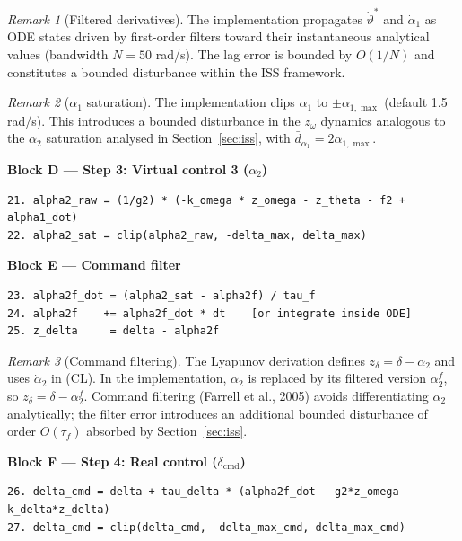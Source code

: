 \documentclass[11pt,a4paper]{article}
\theoremstyle{plain}
\theoremstyle{remark}
\newtheorem{remark}{Remark}[section]
\newcommand{\vths}{\vartheta^*}
\newcommand{\zom}{z_{\omega}}
\newcommand{\zdel}{z_{\delta}}
\newcommand{\dcmd}{\delta_{\mathrm{cmd}}}
\begin{document}
\begin{remark}[Filtered derivatives]
The implementation propagates $\dot\vths$ and $\dot\alpha_1$ as ODE states driven by first-order filters toward their instantaneous analytical values (bandwidth $N = 50$ rad/s). The lag error is bounded by $O(1/N)$ and constitutes a bounded disturbance within the ISS framework.
\end{remark}

\begin{remark}[$\alpha_1$ saturation]
The implementation clips $\alpha_1$ to $\pm\alpha_{1,\max}$ (default 1.5 rad/s). This introduces a bounded disturbance in the $\zom$ dynamics analogous to the $\alpha_2$ saturation analysed in Section~\ref{sec:iss}, with $\bar{d}_{\alpha_1} = 2\alpha_{1,\max}$.
\end{remark}

\textbf{Block D --- Step 3: Virtual control 3 ($\alpha_2$)}

\begin{lstlisting}
21. alpha2_raw = (1/g2) * (-k_omega * z_omega - z_theta - f2 + alpha1_dot)
22. alpha2_sat = clip(alpha2_raw, -delta_max, delta_max)
\end{lstlisting}

\textbf{Block E --- Command filter}

\begin{lstlisting}
23. alpha2f_dot = (alpha2_sat - alpha2f) / tau_f
24. alpha2f    += alpha2f_dot * dt    [or integrate inside ODE]
25. z_delta     = delta - alpha2f
\end{lstlisting}

\begin{remark}[Command filtering]
The Lyapunov derivation defines $\zdel = \delta - \alpha_2$ and uses $\dot\alpha_2$ in (CL). In the implementation, $\alpha_2$ is replaced by its filtered version $\alpha_2^f$, so $\zdel = \delta - \alpha_2^f$. Command filtering (Farrell et al., 2005) avoids differentiating $\alpha_2$ analytically; the filter error introduces an additional bounded disturbance of order $O(\tau_f)$ absorbed by Section~\ref{sec:iss}.
\end{remark}

\textbf{Block F --- Step 4: Real control ($\dcmd$)}

\begin{lstlisting}
26. delta_cmd = delta + tau_delta * (alpha2f_dot - g2*z_omega - k_delta*z_delta)
27. delta_cmd = clip(delta_cmd, -delta_max_cmd, delta_max_cmd)
\end{lstlisting}
\end{document}
